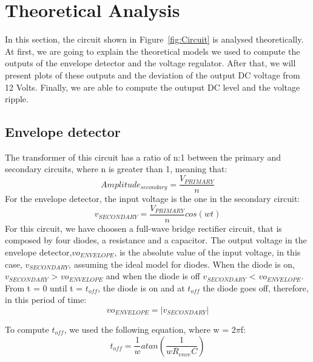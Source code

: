\newpage
\section{Theoretical Analysis}
\label{sec: analysis}
In this section, the circuit shown in Figure~\ref{fig:Circuit} is analysed
theoretically. \\
At first, we are going to explain the theoretical models we used to compute the outputs of the envelope detector and the voltage regulator.
After that, we will present plots of these outputs and the deviation of the output DC voltage from 12 Volts. 
Finally, we are able to compute the outuput DC level and the voltage ripple.

\subsection{Envelope detector}
\label{envelope}

\noindent The transformer of this circuit has a ratio of n:1 between the primary and secondary circuits, where n is greater than 1, meaning that:
 \begin{equation}
Amplitude_{secondary} = \frac{V_{PRIMARY}}{n}
  \label{eq:asecondary}
\end{equation}
\noindent For the envelope detector, the input voltage is the one in the secondary circuit:
 \begin{equation}
v_{SECONDARY} = \frac{V_{PRIMARY}}{n} cos(wt)
  \label{eq:vsecondary}
\end{equation}
\noindent For this circuit, we have choosen a full-wave bridge rectifier circuit, that is composed by four diodes, a resistance and a capacitor.
The output voltage in the envelope detector,$vo_{ENVELOPE}$, is the absolute value of the input voltage, in this case, $v_{SECONDARY}$, assuming the ideal model for diodes.
When the diode is on, $v_{SECONDARY}$ > $vo_{ENVELOPE}$ and when the diode is off $v_{SECONDARY}$ < $vo_{ENVELOPE}$.
From t = 0 until t = $t_{off}$, the diode is on and at $t_{off}$ the diode goes off, therefore, in this period of time:
\begin{equation}
vo_{ENVELOPE} = |v_{SECONDARY}|
  \label{eq:t < toff}
\end{equation}

\noindent To compute $t_{off}$, we used the following equation, where w = 2$\pi$f:
\begin{equation}
t_{off} = \frac{1}{w}atan(\frac{1}{wR_{enve}C})
  \label{eq:toff}
\end{equation}


